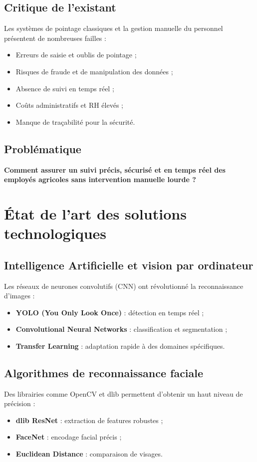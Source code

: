 \documentclass[12pt,a4paper]{report}
\numberwithin{figure}{chapter}
\numberwithin{table}{chapter}
\begin{document}
\subsection{Critique de l'existant}
Les systèmes de pointage classiques et la gestion manuelle du personnel présentent de nombreuses
failles :

\begin{warningbox}
  \begin{itemize}
    \item Erreurs de saisie et oublis de pointage ;
    \item Risques de fraude et de manipulation des données ;
    \item Absence de suivi en temps réel ;
    \item Coûts administratifs et RH élevés ;
    \item Manque de traçabilité pour la sécurité.
  \end{itemize}
\end{warningbox}

\subsection{Problématique}
\textbf{Comment assurer un suivi précis, sécurisé et en temps réel des employés agricoles sans
intervention manuelle lourde ?}

\section{État de l'art des solutions technologiques}

\subsection{Intelligence Artificielle et vision par ordinateur}
Les réseaux de neurones convolutifs (CNN) ont révolutionné la reconnaissance d'images :
\begin{itemize}
  \item \textbf{YOLO (You Only Look Once)} : détection en temps réel ;
  \item \textbf{Convolutional Neural Networks} : classification et segmentation ;
  \item \textbf{Transfer Learning} : adaptation rapide à des domaines spécifiques.
\end{itemize}

\subsection{Algorithmes de reconnaissance faciale}
Des librairies comme OpenCV et dlib permettent d'obtenir un haut niveau de précision :
\begin{itemize}
  \item \textbf{dlib ResNet} : extraction de features robustes ;
  \item \textbf{FaceNet} : encodage facial précis ;
  \item \textbf{Euclidean Distance} : comparaison de visages.
\end{itemize}
\end{document}
